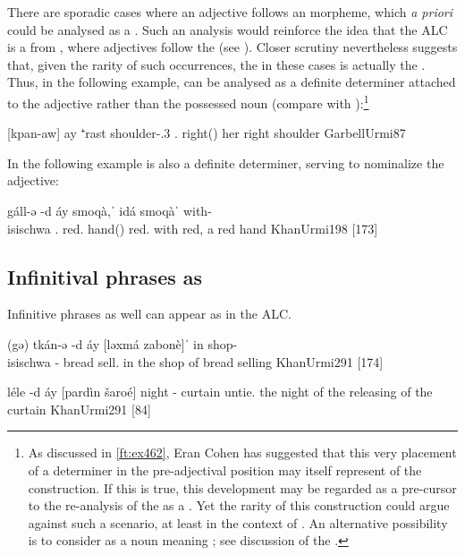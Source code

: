 There are sporadic cases where an adjective follows an  morpheme, which \textit{a priori} could be analysed as a \lnk*. Such an analysis would reinforce the idea that the \JUrm ALC is a  from \Kur, where adjectives follow the \ez* (see ). Closer scrutiny nevertheless suggests that, given the rarity of such occurrences, the  in these cases is actually the . Thus, in the following example,   can be analysed as a definite determiner attached to the adjective rather than the possessed noun (compare with \JZax {}):\footnote{As discussed in \vref{ft:ex462}, Eran Cohen has suggested  that this very placement of a determiner in the pre-adjectival position may itself represent  of the \ez* construction. If this is true, this development may be regarded as a pre-cursor to the re-analysis of the \dem* as a \lnk*. Yet the rarity of this construction could argue against such a scenario, at least in the context of \JUrm. An alternative possibility is to consider  as a noun meaning ; see discussion of the \Kur {}.}

{[kpan-aw] ay ⁺rast}
{shoulder-\poss.3\fem{} .\sg{} right(\invar)}
{her right shoulder}
{GarbellUrmi}{87}





In the following example  is also a definite determiner, serving to nominalize the adjective:


{gáll-ə -d\cb{} áy smoqà,ˈ idá smoqàˈ}
{with-\\isi{schwa}{} \cst\cb{} .\sg{} red.\masc{} hand(\masc) red.\masc}
{with red, a red hand}
{KhanUrmi}{198 {[173]}}

\largerpage
\subsection{Infinitival phrases as \secns}

Infinitive phrases as well can appear as \secns in the \JUrm ALC.

{(gə\cb{}) tkán-ə -d\cb{} áy [ləxmá zabonè]ˈ}
{in shop-\\isi{schwa}{} -\cst\cb{} \lnk{} bread sell.\inf}
{in the shop of bread selling}
{KhanUrmi}{291 {[174]}}

{léle -d\cb{} áy [pardìn šaroé]}
{night -\cst\cb{} \lnk{} curtain untie.\inf}
{the night of the releasing of the curtain}
{KhanUrmi}{291 {[84]}}



